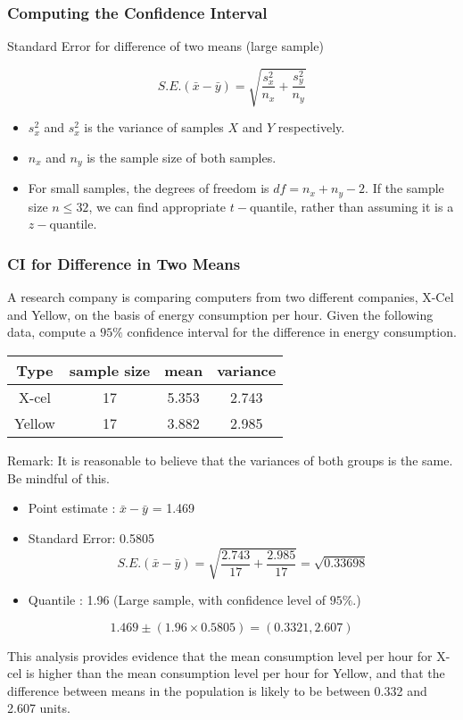 \begin{frame}
\frametitle{Computing the Confidence Interval}
Standard Error for difference of two means (large sample)

\[ S.E.(\bar{x}-\bar{y}) = \sqrt{\frac{s^2_x}{n_x} + \frac{s^2_y}{n_y}} \]

\begin{itemize}
\item $s^2_x$ and $s^2_x$ is the variance of samples $X$ and $Y$ respectively.
\item $n_x$ and $n_y$ is the sample size of both samples.\bigskip

\item For small samples, the degrees of freedom is $df = n_x + n_y - 2$. If the sample size $n \leq 32$, we can find appropriate $t-$quantile, rather than assuming it is a $z-$quantile.
\end{itemize}
\end{frame}

\begin{frame}
\frametitle{CI for Difference in Two Means}
A research company is comparing computers from two different companies, X-Cel and Yellow, on the basis of energy consumption per hour. Given the following data, compute a $95\%$ confidence interval for the difference in energy consumption.
\begin{center}
\begin{tabular}{|c|c|c|c|}
\hline
Type & sample size & mean & variance \\ \hline
X-cel & 17 & 5.353 & 2.743 \\ \hline
Yellow & 17 & 3.882 & 2.985 \\ \hline
\end{tabular}
\end{center}
Remark: It is reasonable to believe that the variances of both groups is the same. Be mindful of this.

\end{frame}
\begin{frame}
\begin{itemize}
\item Point estimate : $\bar{x} - \bar{y}$ = 1.469
\item Standard Error: 0.5805
\[ S.E.(\bar{x}-\bar{y}) = \sqrt{\frac{2.743}{17} + \frac{2.985}{17}} = \sqrt{0.33698} \]
\item Quantile : 1.96 (Large sample, with confidence level of $95\%$.)
\end{itemize}

\[ 1.469  \pm (1.96 \times 0.5805) = (0.3321,2.607) \]


This analysis provides evidence that the mean consumption level per hour for X-cel is higher than the mean consumption level per hour for Yellow, and that the difference between means in the population is likely to be between 0.332 and 2.607 units.
\end{frame}

